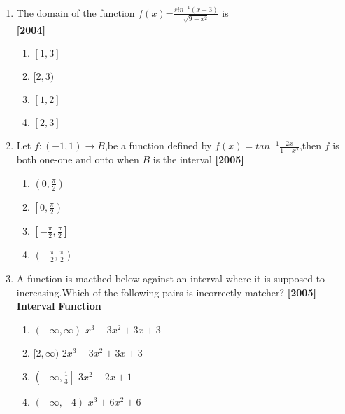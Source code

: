 \documentclass[journal,12pt,twocolumn]{IEEEtran}
\theoremstyle{remark}
\begin{document}
\begin{enumerate}[start=4]
 \item The domain of the function $f(x)$=\(\frac{sin^{-1}(x-3)}{\sqrt{9-x^{2}}}\) is\\
	 \hfill \textbf{[2004]}
              \begin{enumerate}
		      \item $[1,3]$
		      \item $[2,3)$
		      \item $[1,2]$
		      \item $[2,3]$
	      \end{enumerate}
     \item Let $f:(-1,1) \to B$,be a function defined by $f(x)=tan^{-1}\frac{2x}{1-x^{2}}$,then $f$ is both one-one and onto when $B$ is the interval \hfill \textbf{[2005]}
             \begin{enumerate}
		     \item $\left(0,\frac{\pi}{2}\right)$ \\
		     \item $\left[0,\frac{\pi}{2}\right)$ \\
		     \item $\left[-\frac{\pi}{2},\frac{\pi}{2}\right]$ \\
		     \item $\left(-\frac{\pi}{2},\frac{\pi}{2}\right)$
	     \end{enumerate}
     \item A function is macthed below against an interval where it is supposed to increasing.Which of the following pairs is incorrectly matcher? \hfill \textbf{[2005]}\\
	     \hspace{0.5cm}  \textbf{Interval} \hspace{1.4cm} \textbf{Function}
	     \begin{enumerate}
		     \item $(-\infty,\infty)$ \hspace{1cm} $x^{3}-3x^{2}+3x+3$ \\
		     \item $[2,\infty)$ \hspace{1cm} $2x^{3}-3x^{2}+3x+3$ \\
		     \item $\left(-\infty,\frac{1}{3}\right]$ \hspace{1cm} $3x^{2}-2x+1$ \\
		     \item $(-\infty,-4)$ \hspace{1cm} $x^{3}+6x^{2}+6$
	     \end{enumerate}

\end{enumerate}
\end{document}

